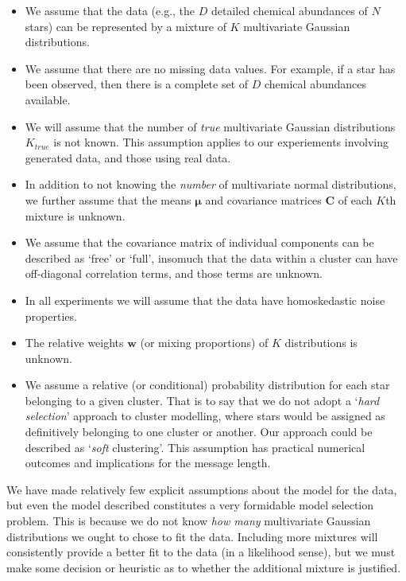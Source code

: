 \documentclass{aastex61}
\begin{document}
\begin{itemize}
\item We assume that the data (e.g., the $D$ detailed chemical abundances of 
      $N$ stars) can be represented by a mixture of $K$ multivariate Gaussian
      distributions.
\item We assume that there are no missing data values. For example, if a star
      has been observed, then there is a complete set of $D$ chemical 
      abundances available.
\item We will assume that the number of \emph{true} multivariate Gaussian
      distributions $K_{true}$ is not known. This assumption applies to our 
      experiements involving generated data, and those using real data.
\item In addition to not knowing the \emph{number} of multivariate normal
      distributions, we further assume that the means $\bm{\mu}$ and 
      covariance matrices $\bm{C}$ of each $K$th mixture is unknown.
\item We assume that the covariance matrix of individual components can be
      described as `free' or `full', insomuch that the data within a cluster
      can have off-diagonal correlation terms, and those terms are unknown.
\item In all experiments we will assume that the data have homoskedastic noise
      properties.
\item The relative weights $\bm{w}$ (or mixing proportions) of $K$ 
      distributions is unknown. 
\item We assume a relative (or conditional) probability distribution for each 
      star belonging to a given cluster. That is to say that we do not adopt a 
      `\emph{hard selection}' approach to cluster modelling, where stars would
      be assigned as definitively belonging to one cluster or another. Our
      approach could be described as `\emph{soft} clustering'. This assumption
      has practical numerical outcomes and implications for the message length.
\end{itemize}

We have made relatively few explicit assumptions about the model for the data,
but even the model described constitutes a very formidable model selection 
problem. This is because we do not know \emph{how many} multivariate Gaussian
distributions we ought to chose to fit the data. Including more mixtures will
consistently provide a better fit to the data (in a likelihood sense), but we 
must make some decision or heuristic as to whether the additional mixture is 
justified.
\end{document}
